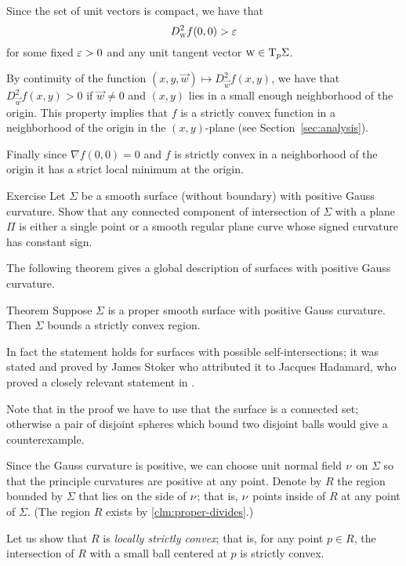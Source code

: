Since the set of unit vectors is compact, we have that 
\[D^2_{\text{\sc{w}}}f(0,0)>\varepsilon\]
for some fixed $\varepsilon>0$ and any unit tangent vector ${\text{\sc{w}}}\in\mathrm{T}_p\Sigma$.

By continuity of the function $(x,y,{\vec w})\mapsto D^2_{\vec w}f(x,y)$,
we have that $D^2_{\vec w}f(x,y)>0$ if $\vec w\ne 0$ and $(x,y)$ lies in a small enough neighborhood of the origin.
This property implies that $f$ is a strictly convex function in a neighborhood of the origin in the $(x,y)$-plane (see Section~\ref{sec:analysis}).

Finally since $\nabla f(0,0)=0$ and $f$ is strictly convex in a neighborhood of the origin it has a strict local minimum at the origin.
\qeds

\begin{thm}{Exercise}\label{ex:section-of-convex}
Let $\Sigma$ be a smooth surface (without boundary) with positive Gauss curvature.
Show that any connected component of intersection of $\Sigma$ with a plane $\Pi$ is either a single point or a smooth regular plane curve whose signed curvature has constant sign.
\end{thm}

The following theorem gives a global description of surfaces with positive Gauss curvature.

\begin{thm}{Theorem}\label{thm:convex-embedded}
Suppose $\Sigma$ is a proper smooth surface with positive Gauss curvature.
Then $\Sigma$ bounds a strictly convex region.
\end{thm}

In fact the statement holds for surfaces with possible self-intersections; it was stated and proved by James Stoker \cite{stoker} who attributed it to Jacques Hadamard, who proved a closely relevant statement in \cite[item 23]{hadamard}.

Note that in the proof we have to use that the surface is a connected set;
otherwise a pair of disjoint spheres which bound two disjoint balls would give a counterexample.

Since the Gauss curvature is positive, we can choose unit normal field $\nu$ on $\Sigma$ so that the principle curvatures are positive at any point.
Denote by $R$ the region bounded by $\Sigma$ that lies on the side of $\nu$;
that is, $\nu$ points inside of $R$ at any point of $\Sigma$.
(The region $R$ exists by \ref{clm:proper-divides}.)

Let us show that $R$ is \emph{locally strictly convex};
that is, for any point $p\in R$, the intersection of $R$ with a small ball centered at $p$ is strictly convex.

